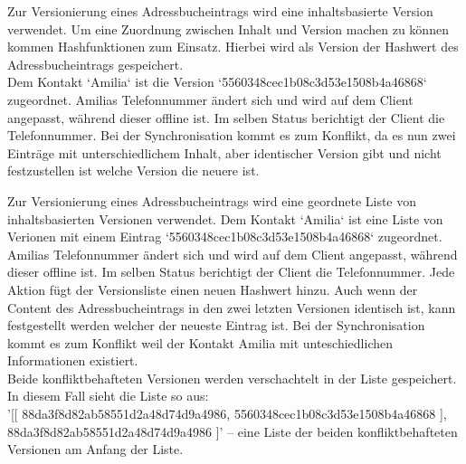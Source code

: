 \begin{description}[leftmargin=0.5cm,style=nextline]
  \item[Methode V3 -- Inhaltsbasierte Version:]%
    Zur Versionierung eines Adressbucheintrags wird eine inhaltsbasierte Version verwendet. Um eine Zuordnung zwischen Inhalt und Version machen zu können kommen \Gls{Hash}funktionen zum Einsatz. Hierbei wird als Version der Hashwert des Adressbucheintrags gespeichert.\\
    Dem Kontakt `Amilia` ist die Version `5560348cec1b08c3d53e1508b4a46868` zugeordnet. Amilias Telefonnummer ändert sich und wird auf dem Client angepasst, während dieser offline ist.
    Im selben Status berichtigt der Client die Telefonnummer. Bei der Synchronisation kommt es zum Konflikt, da es nun zwei Einträge mit unterschiedlichem Inhalt, aber identischer Version gibt und nicht festzustellen ist welche Version die neuere ist.\\
  \item[Methode V4 -- Liste von inhaltsbasierten Versionen:]
    Zur Versionierung eines Adressbucheintrags wird eine geordnete Liste von inhaltsbasierten Versionen verwendet.
    Dem Kontakt `Amilia` ist eine Liste von Verionen mit einem Eintrag `5560348cec1b08c3d53e1508b4a46868` zugeordnet.
    Amilias Telefonnummer ändert sich und wird auf dem Client angepasst, während dieser offline ist. Im selben Status berichtigt der Client die Telefonnummer.
    Jede Aktion fügt der Versionsliste einen neuen Hashwert hinzu.
    Auch wenn der Content des Adressbucheintrags in den zwei letzten Versionen identisch ist, kann festgestellt werden welcher der neueste Eintrag ist.
    Bei der Synchronisation kommt es zum Konflikt weil der Kontakt Amilia mit unteschiedlichen Informationen existiert.\\
    Beide konfliktbehafteten Versionen werden verschachtelt in der Liste gespeichert.
    In diesem Fall sieht die Liste so aus: \\
    '[[ 88da3f8d82ab58551d2a48d74d9a4986, 5560348cec1b08c3d53e1508b4a46868 ], 88da3f8d82ab58551d2a48d74d9a4986 ]' -- eine Liste der beiden konfliktbehafteten Versionen am Anfang der Liste.
\end{description}
%
%
